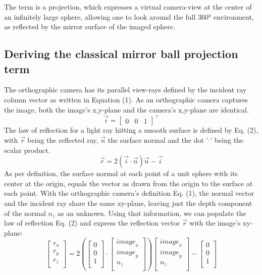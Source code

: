 \documentclass[10pt]{article}
\begin{document}
\begin{multicols}{2}
The term is a projection, which expresses a virtual camera-view at the center of an infinitely large sphere, allowing one to look around the full 360° environment, as reflected by the mirror surface of the imaged sphere.

\subsection{Deriving the classical mirror ball projection term}
The orthographic camera has its parallel view-rays defined by the incident ray column vector as written in Equation (1). As an orthographic camera captures the image, both the image's x,y-plane and the camera's x,y-plane are identical.
$$\vec{i}=\begin{bmatrix}
	0 & 0 & 1
\end{bmatrix}^\intercal$$
The law of reflection for a light ray hitting a smooth surface is defined by Eq. (2), with $\vec{r}$ being the reflected ray, $\vec{n}$ the surface normal and the dot '$\cdot$' being the scalar product.
$$ \vec{r}=2\left(\vec{i}\cdot\vec{n}\right)\vec{n}-\vec{i} $$
As per definition, the surface normal at each point of a unit sphere with its center at the origin, equals the vector as drawn from the origin to the surface at each point. With the orthographic camera's definition Eq. (1), the normal vector and the incident ray share the same xy-plane, leaving just the depth component of the normal $n_z$ as an unknown. Using that information, we can populate the law of reflection Eq. (2) and express the reflection vector $\vec{r}$ with the image's xy-plane:
$$\left[\begin{matrix}r_x\\r_y\\r_z\\\end{matrix}\right]=2\left(\left[\begin{matrix}0\\0\\1\\\end{matrix}\right]\cdot\left[\begin{matrix}{image}_x\\{image}_y\\n_z\\\end{matrix}\right]\right)\left[\begin{matrix}{image}_x\\{image}_y\\n_z\\\end{matrix}\right]-\left[\begin{matrix}0\\0\\1\\\end{matrix}\right]$$

\end{multicols}
\end{document}
